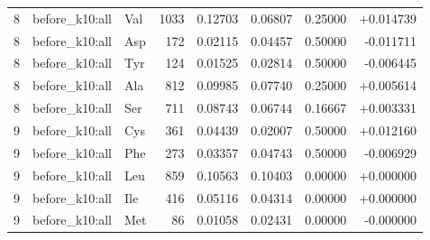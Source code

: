 \begin{longtable}{r l l r r r r r}
8 & before\_k10:all & Val & 1033 & 0.12703 & 0.06807 & 0.25000 & +0.014739 \\
8 & before\_k10:all & Asp & 172 & 0.02115 & 0.04457 & 0.50000 & -0.011711 \\
8 & before\_k10:all & Tyr & 124 & 0.01525 & 0.02814 & 0.50000 & -0.006445 \\
8 & before\_k10:all & Ala & 812 & 0.09985 & 0.07740 & 0.25000 & +0.005614 \\
8 & before\_k10:all & Ser & 711 & 0.08743 & 0.06744 & 0.16667 & +0.003331 \\
9 & before\_k10:all & Cys & 361 & 0.04439 & 0.02007 & 0.50000 & +0.012160 \\
9 & before\_k10:all & Phe & 273 & 0.03357 & 0.04743 & 0.50000 & -0.006929 \\
9 & before\_k10:all & Leu & 859 & 0.10563 & 0.10403 & 0.00000 & +0.000000 \\
9 & before\_k10:all & Ile & 416 & 0.05116 & 0.04314 & 0.00000 & +0.000000 \\
9 & before\_k10:all & Met & 86 & 0.01058 & 0.02431 & 0.00000 & -0.000000 \\
\bottomrule
\end{longtable}
\endgroup

